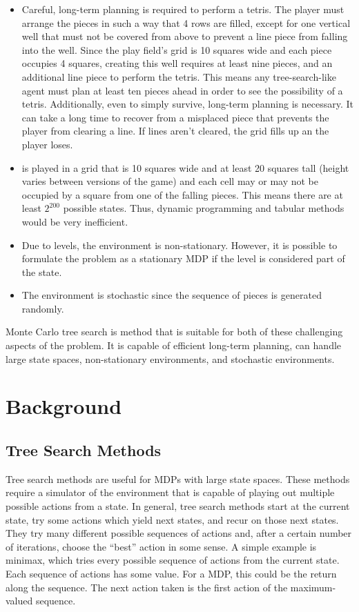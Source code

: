 \documentclass[letterpaper]{article} %
\begin{document}
\begin{itemize}
  \item{
        Careful, long-term planning is required to perform a tetris. The player must arrange the pieces in such a way that 4 rows are
        filled, except for one vertical well that must not be covered from above to prevent a line piece from falling into the well. Since the play field's grid is 10 squares wide and each piece occupies 4 squares, creating this well requires at least
        nine pieces, and an additional line piece to perform the tetris. This means any tree-search-like agent must plan at least ten pieces ahead in order to see the possibility of a tetris. Additionally, even to simply survive, long-term planning is
        necessary. It can take a long time to recover from a misplaced piece that prevents the player from clearing a line. If lines aren't cleared, the grid fills up an the player loses.
        }
  \item{
        \tetris{} is played in a grid that is 10 squares wide and at least 20 squares tall (height varies between versions of the game) and each cell may or may not be occupied by a square from one of the falling pieces. This means there are at least \(2^{200}\)
        possible states. Thus, dynamic programming and tabular methods would be very inefficient.
        }
  \item{
        Due to levels, the environment is non-stationary. However, it is possible to formulate the problem as a stationary MDP if the level is considered part of the state.
        }
  \item{
        The environment is stochastic since the sequence of pieces is generated randomly.
        }
\end{itemize}

Monte Carlo tree search is method that is suitable for both of these challenging aspects of the problem. It is capable of efficient long-term planning, can handle large state spaces, non-stationary environments, and stochastic environments.

\section{Background}

\subsection{Tree Search Methods}
Tree search methods are useful for MDPs with large state spaces. These methods require a simulator of the environment that is capable of playing out multiple possible actions from a state. In general, tree search methods start at the current state,
try some actions which yield next states, and recur on those next states. They try many different possible sequences of actions and, after a certain number of iterations, choose the ``best'' action in some sense. A simple example
is minimax, which tries every possible sequence of actions from the current state. Each sequence of actions has some value. For a MDP, this could be the return along the sequence. The next action taken is the first action of the maximum-valued
sequence.
\end{document}
